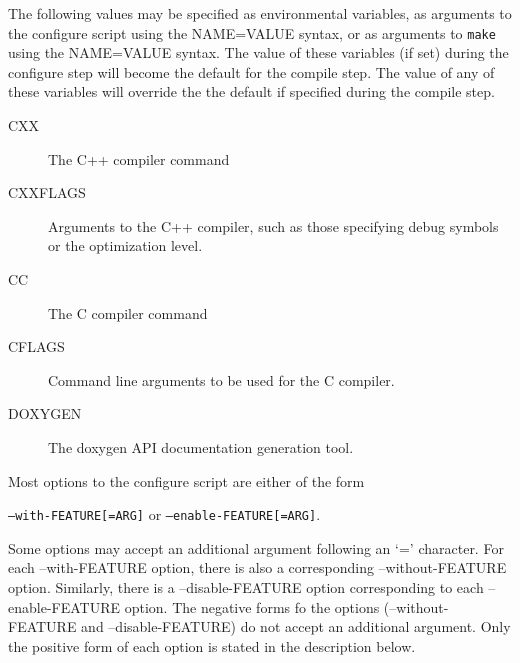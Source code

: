 \label{mes_vars_and_defs}
The following values may be specified as environmental variables, as arguments
to the configure script using the NAME=VALUE syntax, or as arguments to \texttt{make}
using the NAME=VALUE syntax.  The value of these variables (if set) during the
configure step will become the default for the compile step.  The value of any
of these variables will override the the default if specified during the compile
step.
\begin{description}
\item[CXX]       The C++ compiler command
\item[CXXFLAGS]  Arguments to the C++ compiler, such as those specifying 
debug symbols or the optimization level.
\item[CC]        The C compiler command
\item[CFLAGS]    Command line arguments to be used for the C compiler.
\item[DOXYGEN]   The doxygen API documentation generation tool.
\end{description}

Most options to the configure script are either of the form 
\begin{center}
\texttt{--with-FEATURE[=ARG]} or \texttt{--enable-FEATURE[=ARG]}.
\end{center}
Some options may accept an additional argument following 
an `=' character.  For each --with-FEATURE option, there is also a corresponding
--without-FEATURE option.  Similarly, there is a --disable-FEATURE option 
corresponding to each --enable-FEATURE option.  The negative forms fo the options 
(--without-FEATURE and --disable-FEATURE) do not accept an additional argument.  
Only the positive form of each option is stated in the description below.  


